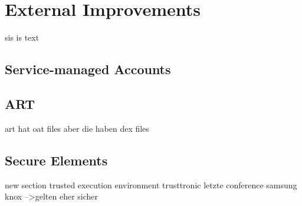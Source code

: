 \section{External Improvements}\label{section:external}
sis is text
\subsection{Service-managed Accounts}
\subsection{ART}\label{subsection:external-art}
art hat oat files aber die haben dex files
\subsection{Secure Elements}\label{subsection:external-secure}



new section trusted execution environment
trusttronic letzte conference
samsung knox
-->gelten eher sicher
